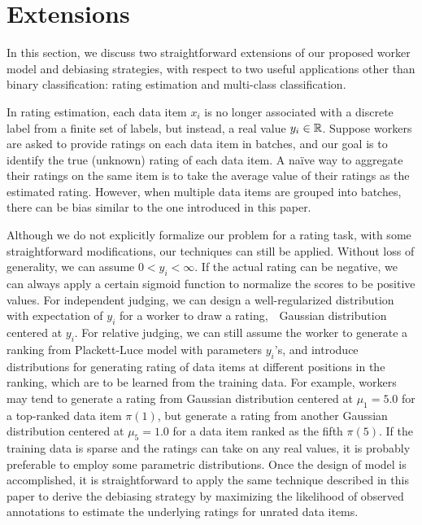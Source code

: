 
\section{Extensions}
\label{sec:ext}

In this section, we discuss two straightforward extensions of our proposed worker model and debiasing strategies, 
with respect to two useful applications other than binary classification: 
rating estimation and multi-class classification.  

In rating estimation,
each data item $x_i$ is no longer associated with a discrete label
from a finite set of labels, 
but instead, a real value $y_i \in {\mathbb{R}}$.  
Suppose workers are asked to provide ratings on each data item in batches, 
and our goal is to identify the true (unknown) rating of each data item.  
A na\"{i}ve way to aggregate their ratings on the same item 
is to take the average value of their ratings as the estimated rating.  
However, when multiple data items are grouped into batches, 
there can be bias similar to the one introduced in this paper.

Although we do not explicitly formalize our problem for a rating task, 
with some straightforward modifications, 
our techniques can still be applied.  
Without loss of generality, we can assume $0 < y_i < \infty$.  
If the actual rating can be negative, 
we can always apply a certain sigmoid function to normalize the scores to be positive values.  
For independent judging, we can design a well-regularized distribution with expectation of $y_i$ 
for a worker to draw a rating,~\eg~Gaussian distribution centered at $y_i$.  
For relative judging, we can still assume the worker to generate a ranking from Plackett-Luce model with parameters $y_i$'s, 
and introduce distributions for generating rating of data items at different positions in the ranking, 
which are to be learned from the training data.  
For example, workers may tend to generate a rating from Gaussian distribution centered at $\mu_1=5.0$ for a top-ranked data item $\pi(1)$, 
but generate a rating from another Gaussian distribution centered at $\mu_5=1.0$ for a data item ranked as the fifth $\pi(5)$.  
If the training data is sparse and the ratings can take on any real values, 
it is probably preferable to employ some parametric distributions.    
Once the design of model is accomplished, 
it is straightforward to apply the same technique described in this paper 
to derive the debiasing strategy by maximizing the likelihood of observed annotations 
to estimate the underlying ratings for unrated data items.  


